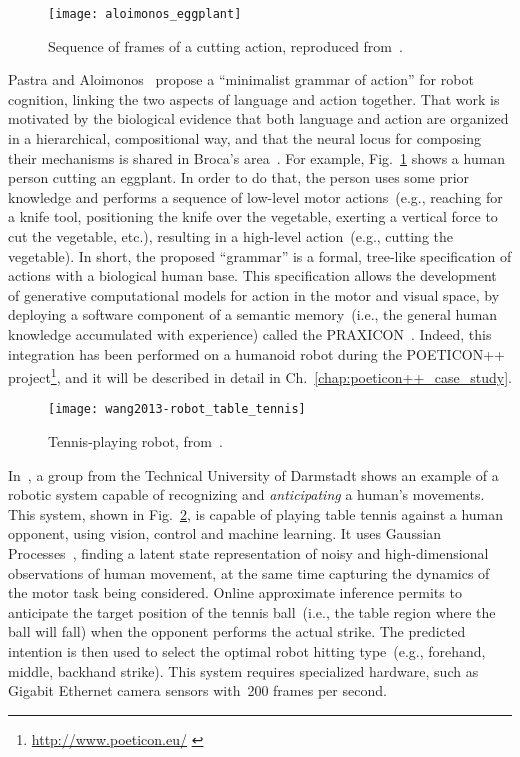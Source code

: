 \begin{figure}
\centering
\texttt{[image: aloimonos\_eggplant]}
\caption{Sequence of frames of a cutting action, reproduced from~\cite{pastra:2012:rstb}.}
\label{fig:minimalist_eggplant}
\end{figure}

Pastra and Aloimonos~\cite{pastra:2012:rstb} propose a ``minimalist grammar of action'' for robot cognition, linking the two aspects of language and action together.
That work is motivated by the biological evidence that both language and action are organized in a hierarchical, compositional way, and that the neural locus for composing their mechanisms is shared in Broca's area~\cite{pulvermuller:2005:broca}.
For example, Fig.~\ref{fig:minimalist_eggplant} shows a human person cutting an eggplant.
In order to do that, the person uses some prior knowledge and performs a sequence of low-level motor actions~(e.g., reaching for a knife tool, positioning the knife over the vegetable, exerting a vertical force to cut the vegetable, etc.), resulting in a high-level action~(e.g., cutting the vegetable).
In short, the proposed ``grammar'' is a formal, tree-like specification of actions with a biological human base.
This specification allows the development of generative computational models for action in the motor and visual space, by deploying a software component of a semantic memory~(i.e., the general human knowledge accumulated with experience) called the PRAXICON~\cite{pastra:2008:praxicon,mavroeidis:2016:praxicon}.
Indeed, this integration has been performed on a humanoid robot during the POETICON++ project\footnote{\url{http://www.poeticon.eu/} \label{footnote:poeticon++}}, and it will be described in detail in Ch.~\ref{chap:poeticon++_case_study}.

\begin{figure}
\centering
\texttt{[image: wang2013-robot\_table\_tennis]}
\caption{Tennis-playing robot, from~\cite{wang:2013:ijrr}.}
\label{fig:robot_table_tennis}
\end{figure}

In~\cite{wang:2013:ijrr}, a group from the Technical University of Darmstadt shows an example of a robotic system capable of recognizing and \emph{anticipating} a human's movements.
This system, shown in Fig.~\ref{fig:robot_table_tennis}, is capable of playing table tennis against a human opponent, using vision, control and machine learning.
It uses Gaussian Processes~\cite[p.~303]{bishop:prml}, finding a latent state representation of noisy and high-dimensional observations of human movement, at the same time capturing the dynamics of the motor task being considered.
Online approximate inference permits to anticipate the target position of the tennis ball~(i.e., the table region where the ball will fall) when the opponent performs the actual strike.
The predicted intention is then used to select the optimal robot hitting type~(e.g., forehand, middle, backhand strike).
This system requires specialized hardware, such as Gigabit Ethernet camera sensors with~200 frames per second.

